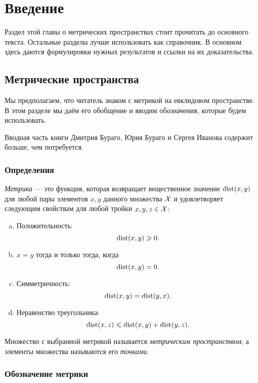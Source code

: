 \chapter*{Введение}

Раздел этой главы о метрических пространствах стоит прочитать до основного текста.
Остальные разделы лучше использовать как справочник.
В основном здесь даются формулировки нужных результатов и ссылки на их доказательства.

\section{Метрические пространства}\label{sec:metric-spcaes}

Мы предполагаем, что читатель знаком с метрикой на евклидовом пространстве. 
В этом разделе мы даём его обобщение и вводим обозначения, которые будем использовать.

Вводная часть книги Дмитрия Бураго, Юрия Бураго и Сергея Иванова \cite{burago-burago-ivanov} содержит больше, чем потребуется.

\subsection*{Определения}

\emph{Метрика} --- это функция, которая возвращает вещественное значение $\mathop{\rm dist}\nolimits(x,y)$ для любой пары элементов $x,y$ данного множества $\mathcal{X}$ и удовлетворяет следующим свойствам для любой тройки $x,y,z\in\mathcal{X}$: \label{page:def:metric}
\begin{enumerate}[(a)]
\item\label{def:metric-space:a} Положительность: 
$$\mathop{\rm dist}\nolimits(x,y)\geqslant 0.$$
\item\label{def:metric-space:b} $x=y$ тогда и только тогда, когда 
$$\mathop{\rm dist}\nolimits(x,y)=0.$$
\item\label{def:metric-space:c} Симметричность: $$\mathop{\rm dist}\nolimits(x, y) = \mathop{\rm dist}\nolimits(y, x).$$
\item\label{def:metric-space:d} Неравенство треугольника: 
$$\mathop{\rm dist}\nolimits(x, z) \leqslant \mathop{\rm dist}\nolimits(x, y) + \mathop{\rm dist}\nolimits(y, z).$$
\end{enumerate}

{\sloppy

Множество с выбранной метрикой называется \emph{метрическим пространством}, а элементы множества называются его \emph{точками}.

}

\subsection*{Обозначение метрики}

